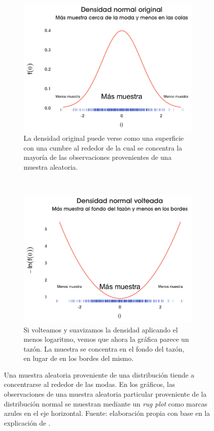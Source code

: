 \begin{figure}[h]
	\centering	
	\begin{subfigure}{0.45\textwidth}
        \includegraphics[width=\textwidth]{Figs/Bayes/Muestra_Normal_Original}
        \caption{La densidad original puede verse como una superficie con una cumbre al rededor de la cual se concentra la mayoría de las observaciones provenientes de una muestra aleatoria.}
        \label{fig:Muestra_Normal_Original}
    \end{subfigure}
    ~ 
    \begin{subfigure}{0.45\textwidth}
        \includegraphics[width=\textwidth]{Figs/Bayes/Muestra_Normal_Volteada}
        \caption{Si volteamos y suavizamos la densidad aplicando el menos logaritmo, vemos que ahora la gráfica parece un tazón. La muestra se concentra en el fondo del tazón, en lugar de en los bordes del mismo.}
        \label{fig:Muestra_Normal_Volteada}
    \end{subfigure}
	\caption{Una muestra aleatoria proveniente de una distribución tiende a concentrarse al rededor de las modas. En los gráficos, las observaciones de una muestra aleatoria particular proveniente de la distribución normal se muestran mediante un \textit{rug plot} como marcas azules en el eje horizontal. Fuente: elaboración propia con base en la explicación de \textcite{Lambert18}.}
	\label{fig:Muestra_Normal}	
\end{figure}

